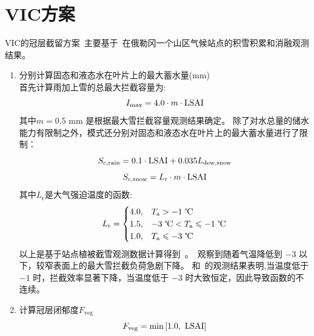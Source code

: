 \section{VIC方案}
VIC的冠层截留方案~\citep{liang1994simple,hamman2018variable}主要基于~\citet{storck2002measurement}在俄勒冈一个山区气候站点的积雪积累和消融观测结果。
\begin{enumerate}
  \item 分别计算固态和液态水在叶片上的最大蓄水量(mm)\\
    首先计算雨加上雪的总最大拦截容量为:
    \begin{equation}
      I_{\mathrm{max}} = 4.0 \cdot m \cdot{\rm LSAI}
    \end{equation}
    其中$m=0.5$ mm 是根据最大雪拦截容量观测结果确定。
    除了对水总量的储水能力有限制之外，模式还分别对固态和液态水在叶片上的最大蓄水量进行了限制：
    \begin{equation}
      S_{\mathrm{c,rain}}=0.1\cdot{\rm LSAI}+0.035 L_{\mathrm{dew,snow}}\\
    \end{equation}
    \begin{equation}
      S_{\mathrm{c,snow}}=L_{\mathrm {r}}\cdot m \cdot{\rm LSAI}
    \end{equation}
    其中$L_{\mathrm {r}} $是大气强迫温度的函数:
    \begin{equation}
      L_{\mathrm {r}}  = \begin{cases}
        4.0, & T_{\mathrm {a}}  > -1 \text{ \textcelsius}\\
        1.5, & -3 \text{ \textcelsius} < T_{\mathrm {a}}  \leqslant -1 \text{ \textcelsius}\\
        1.0, & T_{\mathrm {a}}  \leqslant -3 \text{ \textcelsius}
      \end{cases}
    \end{equation}
    以上是基于站点植被截雪观测数据计算得到~\citep{storck2002measurement}。\citet{kobayashi1987snow}~观察到随着气温降低到 $-3$ \textcelsius 以下，较窄表面上的最大雪拦截负荷急剧下降。 \citet{kobayashi1987snow}和~\citet{pfister1999snow}的观测结果表明,当温度低于 $-1$ \textcelsius 时，拦截效率显著下降，当温度低于 $-3$ \textcelsius 时大致恒定，因此导致函数的不连续。

  \item 计算冠层闭郁度$F_{\mathrm{veg}}$
    \begin{equation}
      F_{\mathrm{veg}} = \min\left[1.0,\ {\rm LSAI} \right]
    \end{equation}


\end{enumerate}
